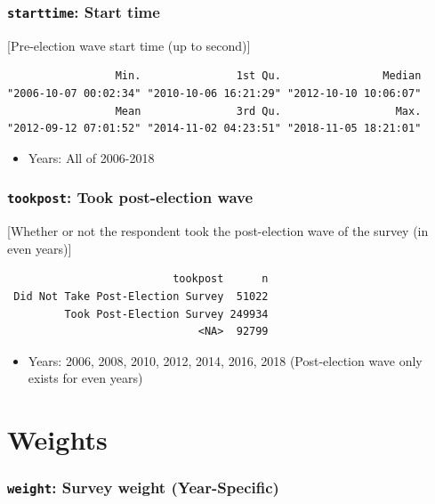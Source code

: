 \documentclass[10pt,article,oneside]{memoir}
\theoremstyle{definition}
\begin{document}
\hypertarget{starttime-start-time}{%
\subsubsection{\texorpdfstring{\texttt{starttime}: Start
time}{starttime: Start time}}\label{starttime-start-time}}

{[}Pre-election wave start time (up to second){]}

\begin{verbatim}
                 Min.               1st Qu.                Median 
"2006-10-07 00:02:34" "2010-10-06 16:21:29" "2012-10-10 10:06:07" 
                 Mean               3rd Qu.                  Max. 
"2012-09-12 07:01:52" "2014-11-02 04:23:51" "2018-11-05 18:21:01" 
\end{verbatim}

\begin{itemize}
\tightlist
\item
  Years: All of 2006-2018
\end{itemize}

\hypertarget{tookpost-took-post-election-wave}{%
\subsubsection{\texorpdfstring{\texttt{tookpost}: Took post-election
wave}{tookpost: Took post-election wave}}\label{tookpost-took-post-election-wave}}

{[}Whether or not the respondent took the post-election wave of the
survey (in even years){]}

\begin{verbatim}
                          tookpost      n
 Did Not Take Post-Election Survey  51022
         Took Post-Election Survey 249934
                              <NA>  92799
\end{verbatim}

\begin{itemize}
\tightlist
\item
  Years: 2006, 2008, 2010, 2012, 2014, 2016, 2018 (Post-election wave
  only exists for even years)
\end{itemize}

\hypertarget{weights}{%
\section{Weights}\label{weights}}

\hypertarget{weight-survey-weight-year-specific}{%
\subsubsection{\texorpdfstring{\texttt{weight}: Survey weight
(Year-Specific)}{weight: Survey weight (Year-Specific)}}\label{weight-survey-weight-year-specific}}
\end{document}
